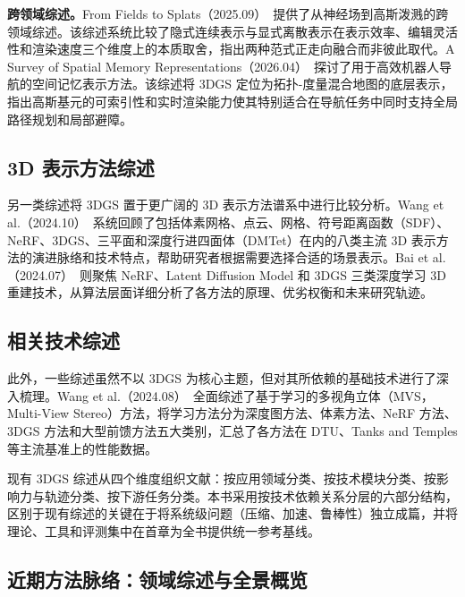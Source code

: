 \textbf{跨领域综述。}From Fields to Splats（2025.09）~\cite{2509_23555}提供了从神经场到高斯泼溅的跨领域综述。该综述系统比较了隐式连续表示与显式离散表示在表示效率、编辑灵活性和渲染速度三个维度上的本质取舍，指出两种范式正走向融合而非彼此取代。A Survey of Spatial Memory Representations（2026.04）~\cite{2604_16482}探讨了用于高效机器人导航的空间记忆表示方法。该综述将 3DGS 定位为拓扑-度量混合地图的底层表示，指出高斯基元的可索引性和实时渲染能力使其特别适合在导航任务中同时支持全局路径规划和局部避障。

\subsection*{3D 表示方法综述}

另一类综述将 3DGS 置于更广阔的 3D 表示方法谱系中进行比较分析。Wang et al.（2024.10）~\cite{2410_06475}系统回顾了包括体素网格、点云、网格、符号距离函数（SDF）、NeRF、3DGS、三平面和深度行进四面体（DMTet）在内的八类主流 3D 表示方法的演进脉络和技术特点，帮助研究者根据需要选择合适的场景表示。Bai et al.（2024.07）~\cite{2407_08137}则聚焦 NeRF、Latent Diffusion Model 和 3DGS 三类深度学习 3D 重建技术，从算法层面详细分析了各方法的原理、优劣权衡和未来研究轨迹。

\subsection*{相关技术综述}

此外，一些综述虽然不以 3DGS 为核心主题，但对其所依赖的基础技术进行了深入梳理。Wang et al.（2024.08）~\cite{2408_15235}全面综述了基于学习的多视角立体（MVS，Multi-View Stereo）方法，将学习方法分为深度图方法、体素方法、NeRF 方法、3DGS 方法和大型前馈方法五大类别，汇总了各方法在 DTU、Tanks and Temples 等主流基准上的性能数据。

\begin{takeaway}
现有 3DGS 综述从四个维度组织文献：按应用领域分类、按技术模块分类、按影响力与轨迹分类、按下游任务分类。本书采用按技术依赖关系分层的六部分结构，区别于现有综述的关键在于将系统级问题（压缩、加速、鲁棒性）独立成篇，并将理论、工具和评测集中在首章为全书提供统一参考基线。
\end{takeaway}


\subsection{近期方法脉络：领域综述与全景概览}

